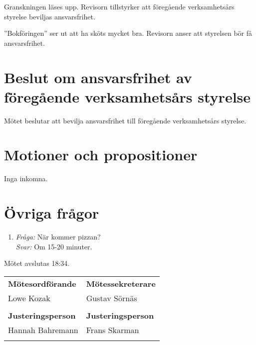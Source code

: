 \documentclass[a4paper]{article}
\newenvironment{quotationb}%
{\begin{leftbar}}%
{\end{leftbar}}
\begin{document}
Granskningen läses upp. Revisorn tillstyrker att föregående verksamhetsårs
styrelse beviljas ansvarsfrihet.

\begin{quotationb}

''Bokföringen'' ser ut att ha sköts mycket bra. Revisorn anser att styrelsen bör
    få ansvarsfrihet.

\end{quotationb}

\section{Beslut om ansvarsfrihet av föregående verksamhetsårs styrelse}

Mötet beslutar att bevilja ansvarsfrihet till föregående verksamhetsårs
styrelse.

\section{Motioner och propositioner}

Inga inkomna.

\section{Övriga frågor}

\begin{enumerate}
\def\labelenumi{\arabic{enumi}.}
\item \emph{Fråga:} När kommer pizzan? \\
    \emph{Svar:} Om 15-20 minuter.
\end{enumerate}

Mötet avslutas 18:34.

\vspace{2em}

\begin{tabular}{@{}p{}p{}@{}}
  \textbf{Mötesordförande} & \textbf{Mötessekreterare} \\[0.3em]
  Lowe Kozak & Gustav Sörnäs \\
  \vspace{8em} &\\
  \textbf{Justeringsperson} & \textbf{Justeringsperson} \\[0.3em]
  Hannah Bahremann & Frans Skarman \\
  \vspace{8em} &\\
\end{tabular}
\end{document}
